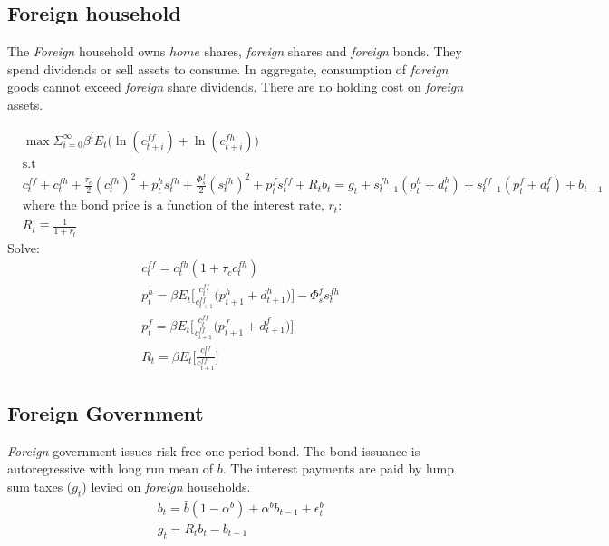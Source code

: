 \documentclass[a4paper]{article}
\begin{document}
\subsection{Foreign household}
The \emph{Foreign} household owns $home$ shares, \emph{foreign} shares and \emph{foreign} bonds. They spend dividends or sell assets to consume. In aggregate, consumption of \emph{foreign} goods cannot exceed \emph{foreign} share dividends. There are no holding cost on \emph{foreign} assets. 

\begin{align*}
&\max \Sigma_{i=0}^\infty \beta^i E_t \bigg(\ln(c^{ff}_{t+i})+ \ln(c^{fh}_{t+i}) \bigg)\\ &\text{s.t}\\
&c^{ff}_t+c^{fh}_t+\frac{\tau_c}{2}(c^{fh}_t)^2+ p^{h}_t s^{fh}_t+\frac{\Phi^f_s}{2}(s^{fh}_t)^2 + p^{f}_t s^{ff}_t+ R_t b_t=g_t+s^{fh}_{t-1}(p^{h}_t+d^{h}_t)+s^{ff}_{t-1}(p^{f}_t+d^{f}_t)+b_{t-1}\\
& \text{where the bond price is a function of the interest rate, $r_t$:}\\
&R_t \equiv \frac{1}{1+r_t}
\end{align*}
Solve:
\begin{align}
&c^{ff}_t=c^{fh}_t(1+\tau_c c^{fh}_t)\\
&p^{h}_t=\beta E_t \bigg[\frac{c^{ff}_t}{c^{ff}_{t+1}} \bigg(  p^{h}_{t+1}+d^{h}_{t+1} \bigg) \bigg] - \Phi^{f}_s s^{fh}_t\\
&p^{f}_t=\beta E_t \bigg[\frac{c^{ff}_t}{c^{ff}_{t+1}} \bigg(  p^{f}_{t+1}+d^{f}_{t+1} \bigg) \bigg]\\
&R_t=\beta E_t \bigg[\frac{c^{ff}_t}{c^{ff}_{t+1}} \bigg] 
\end{align}













\subsection{Foreign Government}
\emph{Foreign} government issues risk free one period bond. The bond issuance is autoregressive with long run mean of $\bar b$. The interest payments are paid by lump sum taxes ($g_t$) levied on \emph{foreign} households.
\begin{align}
&b_{t} = \bar b(1-\alpha^b) + \alpha^b b_{t-1} + \epsilon^b_t\\
&g_t	   = R_t b_{t}-b_{t-1}
\end{align}
\end{document}

